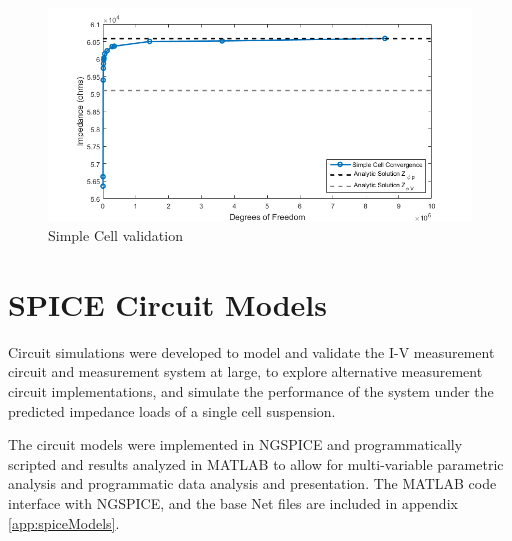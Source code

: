 \begin{figure}
    \centering
    \includegraphics[width=\textwidth]{images/simpleCellValidation.png}
    \caption{Simple Cell validation}
    \label{fig:simple_cell_validation}
\end{figure}


\section{SPICE Circuit Models}
\par  Circuit simulations were developed to model and validate the I-V measurement circuit and measurement system at large, to explore alternative measurement circuit implementations, and simulate the performance of the system under the predicted impedance loads of a single cell suspension. 

\par The circuit models were implemented in NGSPICE and programmatically scripted and results analyzed in MATLAB to allow for multi-variable parametric analysis and programmatic data analysis and presentation. The MATLAB code interface with NGSPICE, and the base Net files are included in appendix \ref{app:spiceModels}. 